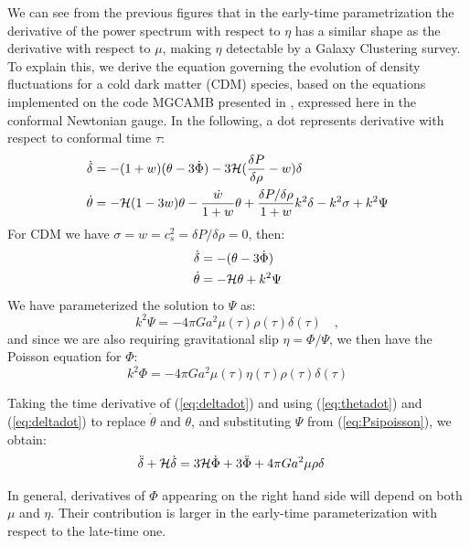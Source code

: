 We can see from the previous figures that in the early-time parametrization the derivative of the power spectrum
with respect to $\eta$ has a similar shape as the derivative with respect to $\mu$, making $\eta$ detectable by a Galaxy Clustering survey.
To explain this, we derive the equation governing the evolution of density fluctuations for a cold dark matter (CDM) species, based on the equations
implemented on the code MGCAMB presented in \cite{hojjati_testing_2011}, expressed here in the conformal Newtonian gauge.
In the following, a dot represents derivative with respect to conformal time $\tau$:
\begin{align}
\dot \delta &= - (1+w)(\theta - 3 \dot \Phi) - 3 \mathcal{H}(\frac{\delta P}{\delta \rho}-w)\delta\\
\dot \theta &= - \mathcal{H} (1-3w)\theta - \frac{\dot w}{1+w} \theta + \frac{\delta P / \delta \rho}{1+w} k^2 \delta - k^2 \sigma + k^2 \Psi
\end{align}
For CDM we have $\sigma = w = c^2_s= \delta P / \delta \rho  = 0$,  then:
\begin{align}
\dot \delta &= -(\theta - 3 \dot \Phi) \label{eq:deltadot}\\
\dot \theta &= -\mathcal{H} \theta + k^2 \Psi \label{eq:thetadot}
\end{align}
We have parameterized the solution to $\Psi$ as:
\begin{equation}\label{eq:Psipoisson}
k^2 \Psi = -4 \pi G a^2 \mu(\tau) \rho(\tau) \delta(\tau) \quad ,
\end{equation}
and since we are also requiring gravitational slip $\eta = \Phi / \Psi$, we then have the Poisson equation for $\Phi$:
\begin{equation}
k^2 \Phi = -4 \pi G a^2 \mu(\tau) \eta(\tau) \rho(\tau) \delta(\tau) \label{eq:Phipoisson}
\end{equation}

Taking the time derivative of (\ref{eq:deltadot}) and using (\ref{eq:thetadot}) and (\ref{eq:deltadot}) to 
replace $\dot \theta$ and $\theta$, and substituting $\Psi$ from (\ref{eq:Psipoisson}), we obtain:
\begin{align}
\ddot{\delta} + \mathcal{H} \dot{\delta} &= 3\mathcal{H} \dot{\Phi} + 3\ddot{\Phi} + 4 \pi G a^2 \mu \rho \delta
\label{eq-delta}
\end{align}

In general, derivatives of $\Phi$ appearing on the right hand side will depend on both $\mu$ and $\eta$. Their contribution is larger in the early-time parameterization with respect to the late-time one.


